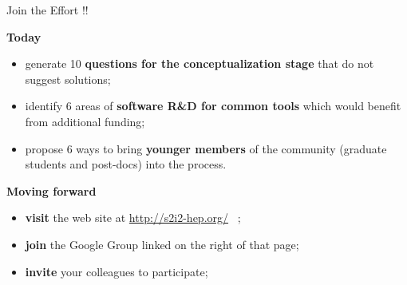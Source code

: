 \documentclass[compress,10]{beamer}
\begin{document}
\begin{frame}{Join the Effort !!}
{}
{\footnotesize
\textcolor{LHCb dark}{\bf Today}
\begin{itemize}
  \item
    generate 10 \textcolor{brickred}{\bf questions for the conceptualization 
    stage} that 
    do not suggest solutions;
  \item
    identify 6 areas of \textcolor{brickred}{\bf software R\&D for common 
    tools}
    which would benefit from
    additional funding;
  \item
    propose 6 ways to bring \textcolor{brickred}{\bf younger members}
     of the community
    (graduate students and post-docs) into the process.
\end{itemize}
\vskip 0.1in
\textcolor{LHCb dark}{\bf Moving forward}
\begin{itemize}
 \item
  \textcolor{brickred}{\bf visit}
    the web site at  \url{http://s2i2-hep.org/}  \, ;
 \item
  \textcolor{brickred}{\bf join}
   the Google Group linked on the right of that page;
 \item
  \textcolor{brickred}{\bf invite} your colleagues to participate;
\end{itemize}
}  %

\end{frame}
\end{document}
